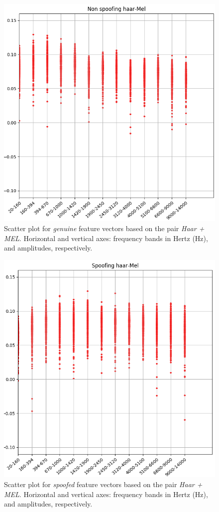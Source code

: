 \begin{figure}[H]
\centering
\includegraphics[scale=.53]{images/results/barkVersusMel/liveHaarMel}
\caption{Scatter plot for \textit{genuine} feature vectors based on the pair \textit{Haar + MEL}. Horizontal and vertical axes: frequency bands in Hertz (Hz), and amplitudes, respectively.}
\label{fig:livehaarmel}
\end{figure}
\begin{figure}[H]
\centering
\includegraphics[scale=.53]{images/results/barkVersusMel/spoofingHaarMel}
\caption{Scatter plot for \textit{spoofed} feature vectors based on the pair \textit{Haar + MEL}. Horizontal and vertical axes: frequency bands in Hertz (Hz), and amplitudes, respectively.}
\label{fig:spoofinghaarmel}
\end{figure}
